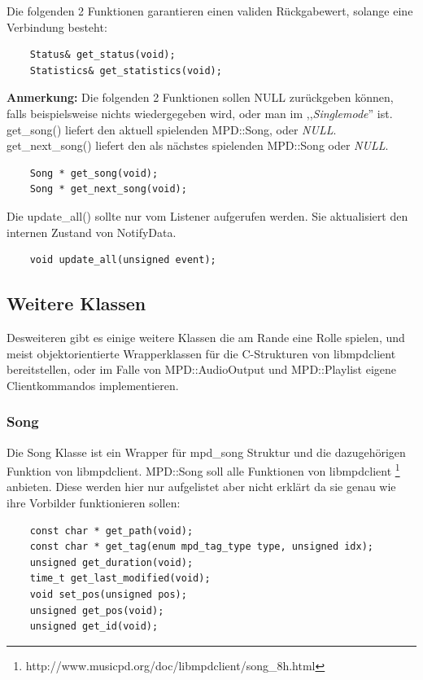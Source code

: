 Die folgenden 2 Funktionen garantieren einen validen Rückgabewert, solange eine Verbindung besteht:
\begin{verbatim}
    Status& get_status(void);
    Statistics& get_statistics(void);
\end{verbatim}

\textbf{Anmerkung:} Die folgenden 2 Funktionen sollen NULL zurückgeben können, falls beispielsweise
nichts wiedergegeben wird, oder man im ,,\textit{Singlemode}'' ist.
get\_song() liefert den aktuell spielenden MPD::Song, oder \emph{NULL}.
get\_next\_song() liefert den als nächstes spielenden MPD::Song oder \emph{NULL}.
\begin{verbatim} 
    Song * get_song(void);
    Song * get_next_song(void);
\end{verbatim}

Die update\_all() sollte nur vom Listener aufgerufen werden. Sie aktualisiert den internen Zustand
von NotifyData.
\begin{verbatim}
    void update_all(unsigned event);
\end{verbatim}


\subsection{Weitere Klassen}
Desweiteren gibt es einige weitere Klassen die am Rande eine Rolle spielen,
und meist objektorientierte Wrapperklassen für die C-Strukturen von libmpdclient bereitstellen,
oder im Falle von MPD::AudioOutput und MPD::Playlist eigene Clientkommandos implementieren.

\subsubsection{Song}

Die Song Klasse ist ein Wrapper für mpd\_song Struktur und die dazugehörigen Funktion von libmpdclient. 
MPD::Song soll alle Funktionen von libmpdclient \footnote{http://www.musicpd.org/doc/libmpdclient/song\_8h.html} anbieten.
Diese werden hier nur aufgelistet aber nicht erklärt da sie genau wie ihre Vorbilder funktionieren sollen:

\begin{verbatim}
    const char * get_path(void);
    const char * get_tag(enum mpd_tag_type type, unsigned idx);
    unsigned get_duration(void);
    time_t get_last_modified(void);
    void set_pos(unsigned pos);
    unsigned get_pos(void);
    unsigned get_id(void);
\end{verbatim}

